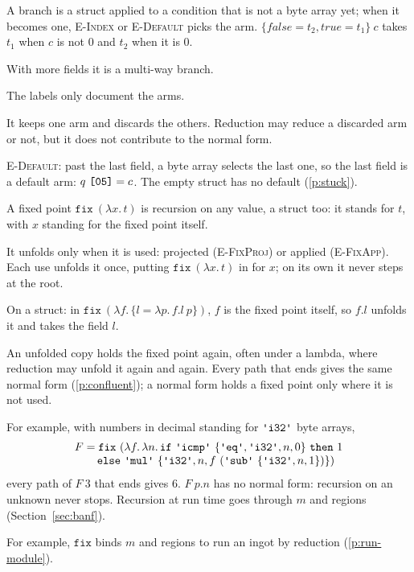 \documentclass[11pt,letterpaper]{article}
\newcommand{\lam}[2]{\lambda #1.\,#2}       %
\newcommand{\rn}[1]{\textsc{#1}}                %
\newcommand{\kw}[1]{\mathtt{#1}}
\newcommand{\str}[1]{\text{\ttfamily\textquotesingle #1\textquotesingle}}  %
\newcommand{\hex}[1]{\text{\ttfamily [#1]}}  %
\newcounter{pt}
\newcommand{\pref}[1]{\ref{#1}}  %
\begin{document}
\begin{points}
  \begin{subpoints}
    \item\label{p:branch} A branch is a struct applied to a condition that is not a byte array yet; when it
    becomes one, \rn{E-Index} or \rn{E-Default} picks the arm.
    $\{\mathit{false} = t_2, \mathit{true} = t_1\}\ c$ takes $t_1$ when $c$ is
    not $0$ and $t_2$ when it is $0$.
  \item With more fields it is a multi-way branch.
  \item The labels only document the arms.
  \item It keeps one arm and discards the others. Reduction
    may reduce a discarded arm or not, but it does not contribute to the normal form.
  \end{subpoints}
\item \rn{E-Default}: past the last field, a byte array selects the last one, so the last field is
  a default arm: $q\ \hex{05} = c$. The empty struct has no default (\pref{p:stuck}).
\item\label{p:fix} A fixed point $\kw{fix}\ (\lam{x}{t})$ is recursion on any value, a struct
  too: it stands for $t$, with $x$ standing for the fixed point itself.
  \begin{subpoints}
  \item It unfolds only when it is used: projected (\rn{E-FixProj}) or applied (\rn{E-FixApp}).
    Each use unfolds it once, putting $\kw{fix}\ (\lam{x}{t})$ in for $x$; on its own it never
    steps at the root.
  \item On a struct: in $\kw{fix}\ (\lam{f}{\{l = \lam{p}{f.l\ p}\}})$, $f$ is the fixed point
    itself, so $f.l$ unfolds it and takes the field $l$.
  \item An unfolded copy holds the fixed point again, often under a lambda, where reduction may
    unfold it again and again. Every path that ends gives the same
    normal form (\pref{p:confluent}); a normal form holds a fixed point only where it is not used.
  \item For example, with numbers in decimal standing for $\str{i32}$ byte arrays,
    \[\begin{array}{l}F = \kw{fix}\ (\lam{f}{\lam{n}{\kw{if}\ \str{icmp}\ \{\str{eq}, \str{i32}, n, 0\}\ \kw{then}\ 1}} \\
\qquad \kw{else}\ \str{mul}\ \{\str{i32}, n, f\ (\str{sub}\ \{\str{i32}, n, 1\})\})\end{array}\]
    every path of $F\ 3$ that ends gives $6$. $F\ p.n$ has no normal form: recursion on an
    unknown never stops. Recursion at run time goes through $m$ and regions (Section~\ref{sec:banf}).
  \item For example, $\kw{fix}$ binds $m$ and regions to run an ingot by reduction (\pref{p:run-module}).
  \end{subpoints}
\end{points}
\end{document}
